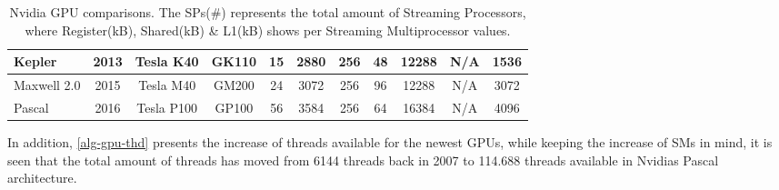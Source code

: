 \begin{table}[]
\begin{adjustbox}{width=1\textwidth}
\begin{tabular}{|l|c|c|c|c|c|c|c|c|c|c|}
	\cite{Nvidia2016} Kepler        & 2013          & Tesla K40    & GK110                              & 15                   & 2880                 & 256                   & 48                  & 12288               & N/A              & 1536             \\ \hline
	\cite{Nvidia2016} Maxwell  2.0   & 2015          & Tesla M40    & GM200                              & 24                   & 3072                 & 256                   & 96                  & 12288               & N/A              & 3072             \\ \hline
	\cite{Nvidia2016} Pascal          & 2016          & Tesla P100   & GP100                              & 56                   & 3584                 & 256                   & 64                  & 16384               & N/A              & 4096             \\ \hline
	\end{tabular}
	\end{adjustbox}
	\caption{Nvidia GPU comparisons. The SPs(\#) represents the total amount of Streaming Processors, where Register(kB), Shared(kB) \& L1(kB) shows per Streaming Multiprocessor values.}
	\label{alg-gpu-var}
\end{table}

In addition, \cref{alg-gpu-thd} presents the increase of threads available for the newest GPUs, while keeping the increase of SMs in mind, it is seen that the total amount of threads has moved from 6144 threads back in 2007 to 114.688 threads available in Nvidias Pascal architecture.
\\\\

